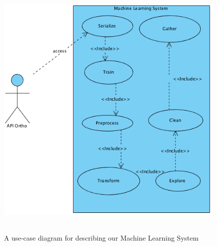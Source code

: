 \documentclass[12pt, french]{report}
\begin{document}
\begin{figure}[h]
	\includegraphics[width=13cm, height =13cm]{images/APIML.png}
	\caption{A use-case diagram for describing our Machine Learning System}
	\label{MLUseCase}
\end{figure} 
\end{document}
